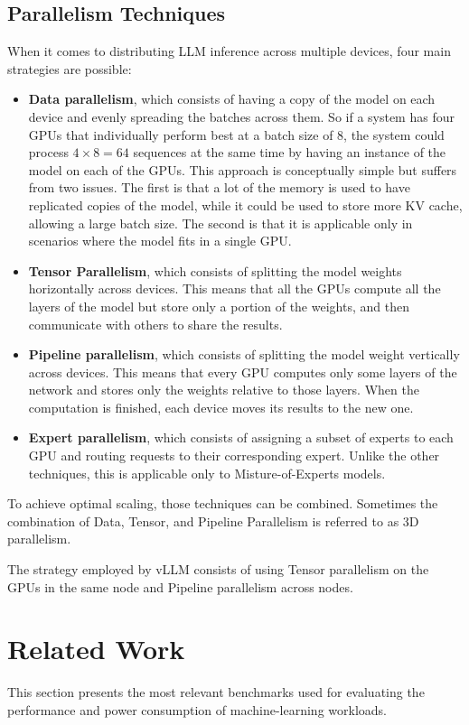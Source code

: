 \documentclass[conference]{IEEEtran}
\begin{document}
\subsection{Parallelism Techniques}
When it comes to distributing LLM inference across multiple devices, four main strategies are possible:
\begin{itemize}
    \item \textbf{Data parallelism}, which consists of having a copy of the model on each device and evenly spreading the batches across them. So if a system has four GPUs that individually perform best at a batch size of 8, the system could process $4 \times 8 = 64$ sequences at the same time by having an instance of the model on each of the GPUs. This approach is conceptually simple but suffers from two issues. The first is that a lot of the memory is used to have replicated copies of the model, while it could be used to store more KV cache, allowing a large batch size. The second is that it is applicable only in scenarios where the model fits in a single GPU.
    \item \textbf{Tensor Parallelism}, which consists of splitting the model weights horizontally across devices. This means that all the GPUs compute all the layers of the model but store only a portion of the weights, and then communicate with others to share the results.
    \item \textbf{Pipeline parallelism}, which consists of splitting the model weight vertically across devices. This means that every GPU computes only some layers of the network and stores only the weights relative to those layers. When the computation is finished, each device moves its results to the new one.
    \item \textbf{Expert parallelism}, which consists of assigning a subset of experts to each GPU and routing requests to their corresponding expert. Unlike the other techniques, this is applicable only to Misture-of-Experts models.
\end{itemize}
To achieve optimal scaling, those techniques can be combined. Sometimes the combination of Data, Tensor, and Pipeline Parallelism is referred to as 3D parallelism.

The strategy employed by vLLM consists of using Tensor parallelism on the GPUs in the same node and Pipeline parallelism across nodes.


\section{Related Work}
This section presents the most relevant benchmarks used for evaluating the performance and power consumption of machine-learning workloads. 
\end{document}
